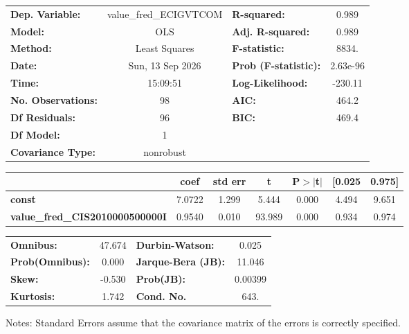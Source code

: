 \begin{center}
\begin{tabular}{lclc}
\toprule
\textbf{Dep. Variable:}                 & value\_fred\_ECIGVTCOM & \textbf{  R-squared:         } &     0.989   \\
\textbf{Model:}                         &          OLS           & \textbf{  Adj. R-squared:    } &     0.989   \\
\textbf{Method:}                        &     Least Squares      & \textbf{  F-statistic:       } &     8834.   \\
\textbf{Date:}                          &    Sun, 13 Sep 2026    & \textbf{  Prob (F-statistic):} &  2.63e-96   \\
\textbf{Time:}                          &        15:09:51        & \textbf{  Log-Likelihood:    } &   -230.11   \\
\textbf{No. Observations:}              &             98         & \textbf{  AIC:               } &     464.2   \\
\textbf{Df Residuals:}                  &             96         & \textbf{  BIC:               } &     469.4   \\
\textbf{Df Model:}                      &              1         & \textbf{                     } &             \\
\textbf{Covariance Type:}               &       nonrobust        & \textbf{                     } &             \\
\bottomrule
\end{tabular}
\begin{tabular}{lcccccc}
                                        & \textbf{coef} & \textbf{std err} & \textbf{t} & \textbf{P$> |$t$|$} & \textbf{[0.025} & \textbf{0.975]}  \\
\midrule
\textbf{const}                          &       7.0722  &        1.299     &     5.444  &         0.000        &        4.494    &        9.651     \\
\textbf{value\_fred\_CIS2010000500000I} &       0.9540  &        0.010     &    93.989  &         0.000        &        0.934    &        0.974     \\
\bottomrule
\end{tabular}
\begin{tabular}{lclc}
\textbf{Omnibus:}       & 47.674 & \textbf{  Durbin-Watson:     } &    0.025  \\
\textbf{Prob(Omnibus):} &  0.000 & \textbf{  Jarque-Bera (JB):  } &   11.046  \\
\textbf{Skew:}          & -0.530 & \textbf{  Prob(JB):          } &  0.00399  \\
\textbf{Kurtosis:}      &  1.742 & \textbf{  Cond. No.          } &     643.  \\
\bottomrule
\end{tabular}
\end{center}

Notes: \newline
 [1] Standard Errors assume that the covariance matrix of the errors is correctly specified.